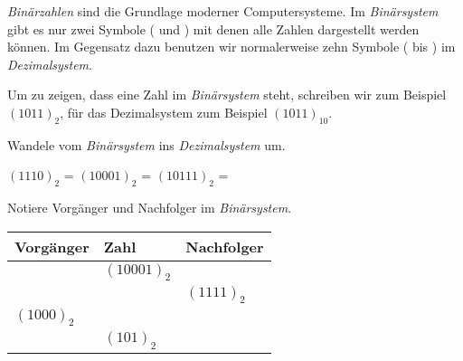\documentclass[10pt, a5paper]{arbeitsblatt}
\begin{document}
\ReiheTitel

\emph{Binärzahlen} sind die Grundlage moderner Computersysteme. Im \emph{Binärsystem} gibt es nur zwei Symbole ( und ) mit denen alle Zahlen dargestellt werden können. Im Gegensatz dazu benutzen wir normalerweise zehn Symbole ( bis ) im \emph{Dezimalsystem}.

Um zu zeigen, dass eine Zahl im \emph{Binärsystem} steht, schreiben wir zum Beispiel $(1011)_2$, für das Dezimalsystem zum Beispiel $(1011)_{10}$.

\begin{aufgabe}[subtitle=Binärzahlen umrechnen]
	Wandele vom \emph{Binärsystem} ins \emph{Dezimalsystem} um.

	\begin{teilaufgaben}
		\teilaufgabe $(1110)_2$ =
		\teilaufgabe $(10001)_2$ =
		\teilaufgabe $(10111)_2$ =
	\end{teilaufgaben}
\end{aufgabe}

\begin{aufgabe}[subtitle=Vorgänger und Nachfolger]
	Notiere Vorgänger und Nachfolger im \emph{Binärsystem}.

	\begin{tabularx}{\textwidth}{|X|X|X|}\hline
		\rowcolor{ab.tabelle.kopf.hg} Vorgänger & Zahl & Nachfolger \\\hline
		\Zeilenabstand & $(10001)_2$ & \\\hline
		\Zeilenabstand & & $(1111)_2$ \\\hline
		$(1000)_2$ &\Zeilenabstand & \\\hline
		\Zeilenabstand & $(101)_2$ & \\\hline
	\end{tabularx}
\end{aufgabe}
\end{document}
